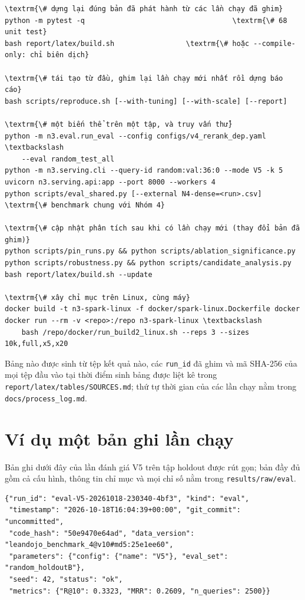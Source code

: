 \documentclass[11pt,a4paper,oneside]{report}
\newcommand{\code}[1]{\texttt{#1}}
\begin{document}
\begin{Verbatim}[fontsize=\footnotesize,frame=single,framesep=2mm,commandchars=\\\{\}]
\textrm{\# dựng lại đúng bản đã phát hành từ các lần chạy đã ghim}
python -m pytest -q                                   \textrm{\# 68 unit test}
bash report/latex/build.sh                 \textrm{\# hoặc --compile-only: chỉ biên dịch}

\textrm{\# tái tạo từ đầu, ghim lại lần chạy mới nhất rồi dựng báo cáo}
bash scripts/reproduce.sh [--with-tuning] [--with-scale] [--report]

\textrm{\# một biến thể trên một tập, và truy vấn thử}
python -m n3.eval.run_eval --config configs/v4_rerank_dep.yaml \textbackslash
    --eval random_test_all
python -m n3.serving.cli --query-id random:val:36:0 --mode V5 -k 5
uvicorn n3.serving.api:app --port 8000 --workers 4
python scripts/eval_shared.py [--external N4-dense=<run>.csv]  \textrm{\# benchmark chung với Nhóm 4}

\textrm{\# cập nhật phân tích sau khi có lần chạy mới (thay đổi bản đã ghim)}
python scripts/pin_runs.py && python scripts/ablation_significance.py
python scripts/robustness.py && python scripts/candidate_analysis.py
bash report/latex/build.sh --update

\textrm{\# xây chỉ mục trên Linux, cùng máy}
docker build -t n3-spark-linux -f docker/spark-linux.Dockerfile docker
docker run --rm -v <repo>:/repo n3-spark-linux \textbackslash
    bash /repo/docker/run_build2_linux.sh --reps 3 --sizes 10k,full,x5,x20
\end{Verbatim}

Bảng nào được sinh từ tệp kết quả nào, các \code{run\_id} đã ghim và mã SHA-256 của mọi tệp đầu vào tại thời điểm sinh
bảng được liệt kê trong \code{report/latex/tables/SOURCES.md}; thứ tự thời gian của các lần chạy nằm trong
\code{docs/process\_log.md}.

\section{Ví dụ một bản ghi lần chạy}\label{app:record}

Bản ghi dưới đây của lần đánh giá V5 trên tập holdout được rút gọn; bản đầy đủ gồm cả cấu hình, thông tin chỉ mục và mọi
chỉ số nằm trong \code{results/raw/eval}.

\noindent\begin{minipage}{\linewidth}
\begin{Verbatim}[fontsize=\footnotesize,frame=single,framesep=2mm]
{"run_id": "eval-V5-20261018-230340-4bf3", "kind": "eval",
 "timestamp": "2026-10-18T16:04:39+00:00", "git_commit": "uncommitted",
 "code_hash": "50e9470e64ad", "data_version": "leandojo_benchmark_4@v10#md5:25e1ee60",
 "parameters": {"config": {"name": "V5"}, "eval_set": "random_holdoutB"},
 "seed": 42, "status": "ok",
 "metrics": {"R@10": 0.3323, "MRR": 0.2609, "n_queries": 2500}}
\end{Verbatim}
\end{minipage}
\end{document}
